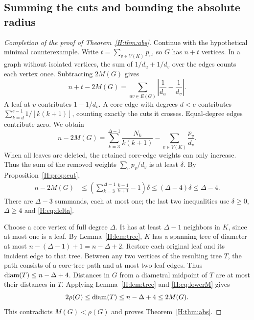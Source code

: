 \documentclass[11pt,a4paper]{article}
\theoremstyle{remark}\newtheorem{remark}[theorem]{Remark}
\numberwithin{equation}{section}
\begin{document}
\subsection{Summing the cuts and bounding the absolute radius}\label{H:sec:sum}
\begin{proof}[Completion of the proof of Theorem~\ref{H:thm:abs}]
Continue with the hypothetical minimal counterexample. Write
$t=\sum_{v\in V(K)}p_v$, so $G$ has $n+t$ vertices. In a graph
without isolated vertices, the sum of $1/d_u+1/d_v$ over the edges
counts each vertex once. Subtracting $2M(G)$ gives
\[
 n+t-2M(G)=\sum_{uv\in E(G)}\left|\frac1{d_u}-\frac1{d_v}\right|.
\]
A leaf at $v$ contributes $1-1/d_v$. A core edge with degrees
$d<e$ contributes $\sum_{k=d}^{e-1}1/[k(k+1)]$, counting exactly
the cuts it crosses. Equal-degree edges contribute zero. We obtain
\begin{equation}\label{H:eq:sum}
 n-2M(G)=\sum_{k=3}^{\Delta-1}\frac{N_k}{k(k+1)}
                     -\sum_{v\in V(K)}\frac{p_v}{d_v}.
\end{equation}
When all leaves are deleted, the retained core-edge weights can only
increase. Thus the sum of the removed weights $\sum_v p_v/d_v$ is at
least $\delta$. By Proposition~\ref{H:prop:cut},
\begin{align}
 n-2M(G)
 &\le \left(\sum_{k=3}^{\Delta-1}\frac{k-1}{k+1}-1\right)\delta
 \le(\Delta-4)\delta
 \le\Delta-4 . \label{H:eq:lowerM}
\end{align}
There are $\Delta-3$ summands, each at most one; the last two
inequalities use $\delta\ge0$, $\Delta\ge4$ and \eqref{H:eq:delta}.

Choose a core vertex of full degree $\Delta$. It has at least
$\Delta-1$ neighbors in $K$, since at most one is a leaf. By
Lemma~\ref{H:lem:tree}, $K$ has a spanning tree of diameter at most
$n-(\Delta-1)+1=n-\Delta+2$. Restore each original leaf and its
incident edge to that tree. Between any two vertices of the resulting
tree $T$, the path consists of a core-tree path and at most two leaf
edges. Thus $\operatorname{diam}(T)\le n-\Delta+4$. Distances in $G$ from a
diametral midpoint of $T$ are at most their distances in $T$. Applying
Lemma~\ref{H:lem:tree} and \eqref{H:eq:lowerM} gives
\begin{equation}\label{H:eq:contradiction}
 2\rho(G)\le\operatorname{diam}(T)\le n-\Delta+4\le 2M(G).
\end{equation}
This contradicts $M(G)<\rho(G)$ and proves Theorem~\ref{H:thm:abs}.
\end{proof}
\end{document}
